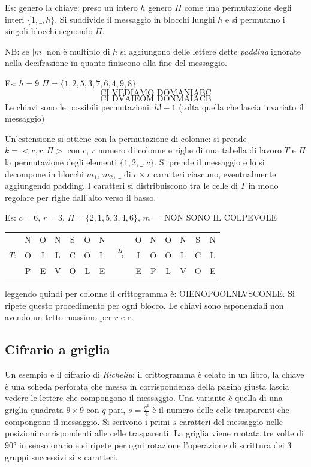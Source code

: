 Es: genero la chiave: preso un intero $h$ genero $\Pi$ come una permutazione degli interi $\{1,\_,h\}$. Si suddivide il messaggio in blocchi lunghi $h$ e si permutano i singoli blocchi seguendo $\Pi$.

NB: se $|m|$ non è multiplo di $h$ si aggiungono delle lettere dette \emph{padding} ignorate nella decifrazione in quanto finiscono alla fine del messaggio.

Es: $h = 9$ $\Pi=\{1, 2, 5, 3, 7, 6, 4, 9, 8\}$
$$ \text{CI VEDIAMO DOMANIABC} $$
$$ \text{CI DVAIEOM DONMAIACB} $$
Le chiavi sono le possibili permutazioni: $h!-1$ (tolta quella che lascia invariato il messaggio)

Un'estensione si ottiene con la permutazione di colonne: si prende $k=<c, r, \Pi>$ con $c$, $r$ numero di colonne e righe di una tabella di lavoro $T$ e $\Pi$ la permutazione degli elementi $\{1, 2, \_, c\}$. Si prende il messaggio e lo si decompone in blocchi $m_1$, $m_2$, $\_$ di $c \times r$ caratteri ciascuno, eventualmente aggiungendo padding. I caratteri si distribuiscono tra le celle di $T$ in modo regolare per righe dall'alto verso il basso.

Es: $c = 6$, $r = 3$, $\Pi=\{2, 1, 5, 3, 4, 6\}$, $m=$ NON SONO IL COLPEVOLE
\begin{table}[!ht]
    \centering
    \begin{tabular}{c c c c c c c c c c c c c c}
             & N & O & N & S & O & N &                      & O & N & O & N & S & N\\
        $T$: & O & I & L & C & O & L & $\xrightarrow{\Pi}$  & I & O & O & L & C & L\\
             & P & E & V & O & L & E &                      & E & P & L & V & O & E\\
    \end{tabular}
\end{table}
leggendo quindi per colonne il crittogramma è: OIENOPOOLNLVSCONLE. Si ripete questo procedimento per ogni blocco. Le chiavi sono esponenziali non avendo un tetto massimo per $r$ e $c$.


\subsection{Cifrario a griglia}
Un esempio è il cifrario di \emph{Richeliu}: il crittogramma è celato in un libro, la chiave è una scheda perforata che messa in corrispondenza della pagina giusta lascia vedere le lettere che compongono il messaggio. Una variante è quella di una griglia quadrata $9\times9$ con $q$ pari, $s = \frac{q^2}{4}$ è il numero delle celle trasparenti che compongono il messaggio. Si scrivono i primi $s$ caratteri del messaggio nelle posizioni corrispondenti alle celle trasparenti. La griglia viene ruotata tre volte di $90$° in senso orario e si ripete per ogni rotazione l'operazione di scrittura dei 3 gruppi successivi si $s$ caratteri.

